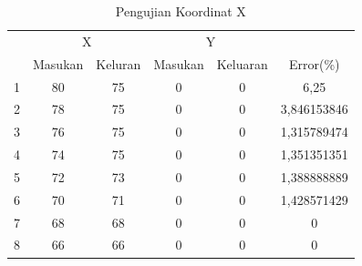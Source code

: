  \begin{table}[]
 	\caption{Pengujian Koordinat X}
 	\label{tbl.koordinatx}
 	\centering
 	\begin{tabular}{|c|c|c|c|c|c|}
 		\hline
 		\rowcolor[HTML]{9B9B9B} 
 		\cellcolor[HTML]{9B9B9B}                     & \multicolumn{2}{c|}{\cellcolor[HTML]{9B9B9B}X} & \multicolumn{2}{c|}{\cellcolor[HTML]{9B9B9B}Y} & \cellcolor[HTML]{9B9B9B}                           \\ \cline{2-5}
 		\rowcolor[HTML]{9B9B9B} 
 		\multirow{-2}{*}{\cellcolor[HTML]{9B9B9B}No} & Masukan                & Keluran               & Masukan               & Keluaran               & \multirow{-2}{*}{\cellcolor[HTML]{9B9B9B}Error(\%)} \\ \hline
 			1                                            & 80                     & 75                    & 0                     & 0                      & 6,25                                               \\ \hline
 			2                                            & 78                     & 75                    & 0                     & 0                      & 3,846153846                                        \\ \hline
 			3                                            & 76                     & 75                    & 0                     & 0                      & 1,315789474                                        \\ \hline
 			4                                            & 74                     & 75                    & 0                     & 0                      & 1,351351351                                        \\ \hline
 			5                                            & 72                     & 73                    & 0                     & 0                      & 1,388888889                                        \\ \hline
 			6                                            & 70                     & 71                    & 0                     & 0                      & 1,428571429                                        \\ \hline
 			7                                            & 68                     & 68                    & 0                     & 0                      & 0                                                  \\ \hline
 			8                                            & 66                     & 66                    & 0                     & 0                      & 0                                                  \\ \hline

\end{tabular}
\end{table}
